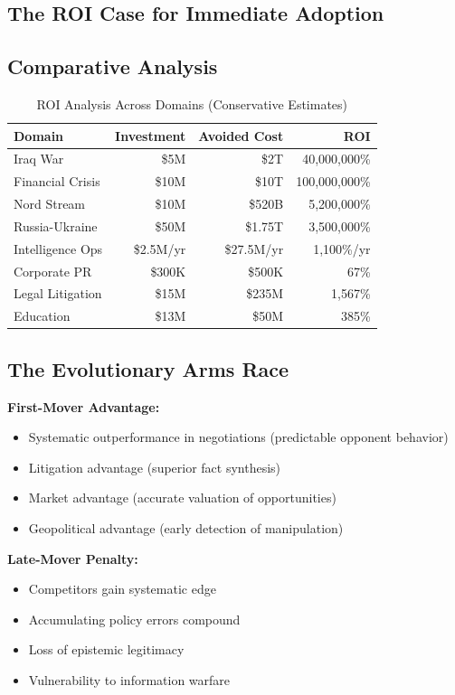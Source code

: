 \documentclass[11pt,a4paper]{article}
\theoremstyle{definition}
\theoremstyle{remark}
\begin{document}
\begin{small}
\section{The ROI Case for Immediate Adoption}

\subsection{Comparative Analysis}

\begin{table}[h]
\centering
\small
\begin{tabular}{|l|r|r|r|}
\hline
\textbf{Domain} & \textbf{Investment} & \textbf{Avoided Cost} & \textbf{ROI} \\
\hline
Iraq War & \$5M & \$2T & 40,000,000\% \\
Financial Crisis & \$10M & \$10T & 100,000,000\% \\
Nord Stream & \$10M & \$520B & 5,200,000\% \\
Russia-Ukraine & \$50M & \$1.75T & 3,500,000\% \\
Intelligence Ops & \$2.5M/yr & \$27.5M/yr & 1,100\%/yr \\
Corporate PR & \$300K & \$500K & 67\% \\
Legal Litigation & \$15M & \$235M & 1,567\% \\
Education & \$13M & \$50M & 385\% \\
\hline
\end{tabular}
\caption{ROI Analysis Across Domains (Conservative Estimates)}
\end{table}

\subsection{The Evolutionary Arms Race}

\textbf{First-Mover Advantage:}
\begin{itemize}
\item Systematic outperformance in negotiations (predictable opponent behavior)
\item Litigation advantage (superior fact synthesis)
\item Market advantage (accurate valuation of opportunities)
\item Geopolitical advantage (early detection of manipulation)
\end{itemize}

\textbf{Late-Mover Penalty:}
\begin{itemize}
\item Competitors gain systematic edge
\item Accumulating policy errors compound
\item Loss of epistemic legitimacy
\item Vulnerability to information warfare
\end{itemize}


\end{small}
\end{document}
